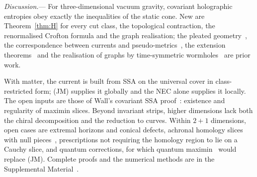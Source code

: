 \documentclass[aps,prl,twocolumn,superscriptaddress,nofootinbib,amsmath,amssymb]{revtex4-2}
\theoremstyle{definition}
\newcommand{\SM}{Supplemental Material~\cite{SM}}
\begin{document}
\emph{Discussion.}---%
For three-dimensional vacuum gravity, covariant holographic entropies obey exactly the inequalities of the static
cone. New are
Theorem~\ref{thm:H} for every cut class, the topological contraction, the renormalised Crofton formula and the
graph realisation; the pleated geometry~\cite{MazzoliViaggi2022}, the correspondence
between currents and pseudo-metrics~\cite{BIPP2021,MartinezGranadoThurston2026}, the extension
theorems~\cite{BernalSanchez2006,AkeFloresSanchez2021} and the realisation of graphs by time-symmetric
wormholes~\cite{Bao2015} are prior work.

With matter, the current is built from SSA on the universal cover in class-restricted form; (JM) supplies it
globally and the NEC alone supplies it locally. The open inputs are those of Wall's covariant SSA
proof~\cite{Wall2014,MarolfWallWang2019}: existence and regularity of maximin slices. Beyond invariant strips,
higher dimensions lack both the chiral decomposition and the reduction to curves. Within $2+1$ dimensions, open cases are
extremal horizons and conical defects, achronal homology slices with null pieces~\cite{Wall2014}, prescriptions
not requiring the homology region to lie on a Cauchy slice, and quantum corrections, for which quantum
maximin~\cite{AkersEtAl2020} would replace (JM). Complete proofs and the numerical methods are in the \SM.

\begin{acknowledgments}
\end{acknowledgments}



\end{document}
